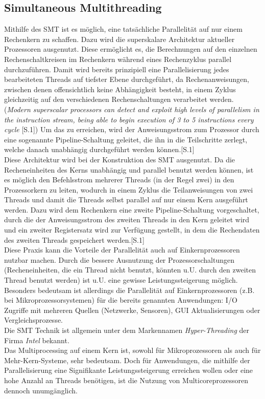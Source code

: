 \subsection{Simultaneous Multithreading}
Mithilfe des \ac{SMT} ist es möglich, eine tatsächliche Parallelität auf nur einem Rechenkern zu schaffen. Dazu wird die superskalare Architektur aktueller Prozessoren ausgenutzt. Diese ermöglicht es, die Berechnungen auf den einzelnen Rechenschaltkreisen im Rechenkern während eines Rechenzyklus parallel durchzuführen. Damit wird bereits prinzipiell eine Parallelisierung jedes bearbeiteten Threads auf tiefster Ebene durchgeführt, da Rechenanweisungen, zwischen denen offensichtlich keine Abhängigkeit besteht, in einem Zyklus gleichzeitig auf den verschiedenen Rechenschaltungen verarbeitet werden. (\textit{\glqq Modern superscalar processors can detect and exploit high levels of parallelism in the
instruction stream,  being able to begin execution of 3 to 5 instructions every cycle\grqq} \cite{Tullsen_Simultaneous_Multithreading}[S.1]) Um das zu erreichen, wird der Anweisungsstrom zum Prozessor durch eine sogenannte Pipeline-Schaltung geleitet, die ihn in die Teilschritte zerlegt, welche danach unabhängig durchgeführt werden können.\cite{Tullsen_Simultaneous_Multithreading}[S.1]\\
Diese Architektur wird bei der Konstruktion des \ac{SMT} ausgenutzt. Da die Recheneinheiten des Kerns unabhängig und parallel benutzt werden können, ist es möglich den Befehlsstrom mehrerer Threads (in der Regel zwei) in den Prozessorkern zu leiten, wodurch in einem Zyklus die Teilanweisungen von zwei Threads und damit die Threads selbst parallel auf nur einem Kern ausgeführt werden. Dazu wird dem Rechenkern eine zweite Pipeline-Schaltung vorgeschaltet, durch die der Anweisungsstrom des zweiten Threads in den Kern geleitet wird und ein zweiter Registersatz wird zur Verfügung gestellt, in dem die Rechendaten des zweiten Threads gespeichert werden.\cite{Tullsen_Simultaneous_Multithreading}[S.1]\\
Diese Praxis kann die Vorteile der Parallelität auch auf Einkernprozessoren nutzbar machen. Durch die bessere Ausnutzung der Prozessorschaltungen (Recheneinheiten, die ein Thread nicht benutzt, könnten u.U. durch den zweiten Thread benutzt werden) ist u.U. eine gewisse Leistungssteigerung möglich. Besonders bedeutsam ist allerdings die Parallelität auf Einkernprozessoren (z.B. bei Mikroprozessorsystemen) für die bereits genannten Anwendungen: \ac{I/O} Zugriffe mit mehreren Quellen (Netzwerke, Sensoren), \ac{GUI} Aktualisierungen oder Vergleichsprozesse.\\
Die \ac{SMT} Technik ist allgemein unter dem Markennamen \textit{Hyper-Threading} der Firma \textit{Intel} bekannt.\\[0.5 cm]
Das Multiprocessing auf einem Kern ist, sowohl für Mikroprozessoren als auch für Mehr-Kern-Systeme, sehr bedeutsam. Doch für Anwendungen, die mithilfe der Parallelisierung eine Signifikante Leistungssteigerung erreichen wollen oder eine hohe Anzahl an Threads benötigen, ist die Nutzung von Multicoreprozessoren dennoch unumgänglich.


